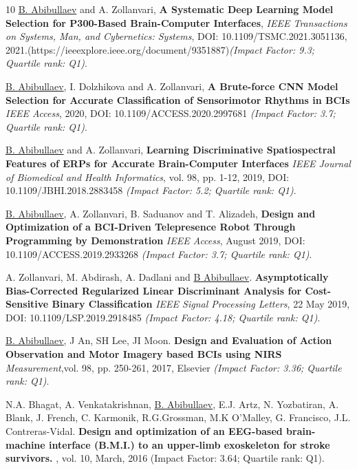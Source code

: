 \documentclass[10pt,letterpaper,sans]{moderncv}   %
\begin{document}
\label{publication}
\begin{thebibliography}{10}
    \small 
    \underline{B. Abibullaev} and A. Zollanvari,
    \newblock \textbf{A Systematic Deep Learning Model Selection for P300-Based Brain-Computer Interfaces},
    \newblock \textit{IEEE Transactions on Systems, Man, and Cybernetics: Systems}, DOI: 10.1109/TSMC.2021.3051136, 2021.(https://ieeexplore.ieee.org/document/9351887)\textit{(Impact Factor: 9.3; Quartile rank: Q1)}.

    \small 
    \underline{B. Abibullaev}, I. Dolzhikova and A. Zollanvari, 
    \newblock \textbf{A Brute-force CNN Model Selection for Accurate Classification of Sensorimotor Rhythms in BCIs} \newblock \textit{IEEE Access}, 2020,  DOI: 10.1109/ACCESS.2020.2997681
    \textit{(Impact Factor: 3.7; Quartile rank: Q1)}.

    \small 
    \underline{B. Abibullaev} and A. Zollanvari,
    \newblock \textbf{Learning Discriminative Spatiospectral Features of ERPs for Accurate Brain-Computer Interfaces}
    \newblock \textit{IEEE Journal of Biomedical and Health Informatics}, vol. 98, pp. 1-12, 2019, DOI: 10.1109/JBHI.2018.2883458 \textit{(Impact Factor: 5.2; Quartile rank: Q1)}.

    \small 
    \underline{B. Abibullaev}, A. Zollanvari, B. Saduanov and T. Alizadeh, 
    \newblock \textbf{Design and Optimization of a BCI-Driven Telepresence Robot Through Programming by Demonstration}
    \newblock \textit{IEEE Access}, August 2019,  DOI: 10.1109/ACCESS.2019.2933268
    \textit{(Impact Factor: 3.7; Quartile rank: Q1)}.

    \small 
    A. Zollanvari,  M. Abdirash, A. Dadlani and \underline{B Abibullaev}.
    \newblock \textbf{Asymptotically Bias-Corrected Regularized Linear Discriminant Analysis for Cost-Sensitive Binary Classification}
    \newblock \textit{IEEE Signal Processing Letters}, 22 May 2019,  DOI: 10.1109/LSP.2019.2918485 \textit{(Impact Factor: 4.18; Quartile rank: Q1)}.
        
    \small 
    \underline{B. Abibullaev}, J An, SH Lee, JI Moon.
    \newblock \textbf{Design and Evaluation of Action Observation and Motor Imagery based {BCIs} using {NIRS}} \newblock \textit{Measurement},vol. 98, pp. 250-261, 2017, Elsevier \textit{(Impact Factor: 3.36; Quartile rank: Q1)}.
    
    \small
    N.A. Bhagat, A. Venkatakrishnan, \underline{B. Abibullaev}, E.J. Artz, N. Yozbatiran, A. Blank, J. French, C. Karmonik, R.G.Grossman, M.K O'Malley, G. Francisco, J.L. Contreras-Vidal.
    \newblock \textbf{Design and optimization of an {EEG}-based brain-machine interface (B.M.I.) to an upper-limb exoskeleton for stroke survivors.}
    , vol. 10, March, 2016 (Impact Factor: 3.64; Quartile rank: Q1).
    

\end{thebibliography}
\end{document}
